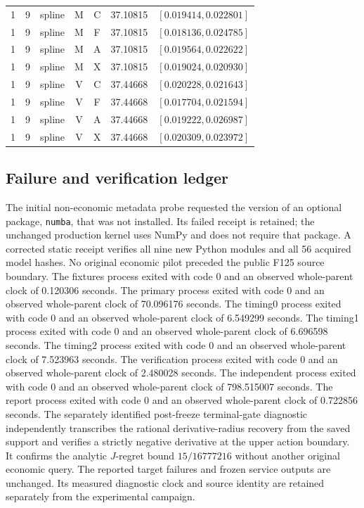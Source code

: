\begin{longtable}{r r l c c r l}
1 & 9 & spline & M & C & 37.10815 & $[0.019414,0.022801]$ \\
1 & 9 & spline & M & F & 37.10815 & $[0.018136,0.024785]$ \\
1 & 9 & spline & M & A & 37.10815 & $[0.019564,0.022622]$ \\
1 & 9 & spline & M & X & 37.10815 & $[0.019024,0.020930]$ \\
1 & 9 & spline & V & C & 37.44668 & $[0.020228,0.021643]$ \\
1 & 9 & spline & V & F & 37.44668 & $[0.017704,0.021594]$ \\
1 & 9 & spline & V & A & 37.44668 & $[0.019222,0.026987]$ \\
1 & 9 & spline & V & X & 37.44668 & $[0.020309,0.023972]$ \\
\hline\end{longtable}\endgroup
\subsection{Failure and verification ledger}
The initial non-economic metadata probe requested the version of an optional package, \texttt{numba}, that was not installed. Its failed receipt is retained; the unchanged production kernel uses NumPy and does not require that package. A corrected static receipt verifies all nine new Python modules and all 56 acquired model hashes. No original economic pilot preceded the public F125 source boundary.
The fixtures process exited with code 0 and an observed whole-parent clock of 0.120306 seconds.
The primary process exited with code 0 and an observed whole-parent clock of 70.096176 seconds.
The timing0 process exited with code 0 and an observed whole-parent clock of 6.549299 seconds.
The timing1 process exited with code 0 and an observed whole-parent clock of 6.696598 seconds.
The timing2 process exited with code 0 and an observed whole-parent clock of 7.523963 seconds.
The verification process exited with code 0 and an observed whole-parent clock of 2.480028 seconds.
The independent process exited with code 0 and an observed whole-parent clock of 798.515007 seconds.
The report process exited with code 0 and an observed whole-parent clock of 0.722856 seconds.
The separately identified post-freeze terminal-gate diagnostic independently transcribes the rational derivative-radius recovery from the saved support and verifies a strictly negative derivative at the upper action boundary. It confirms the analytic $J$-regret bound $15/16777216$ without another original economic query. The reported target failures and frozen service outputs are unchanged. Its measured diagnostic clock and source identity are retained separately from the experimental campaign.


